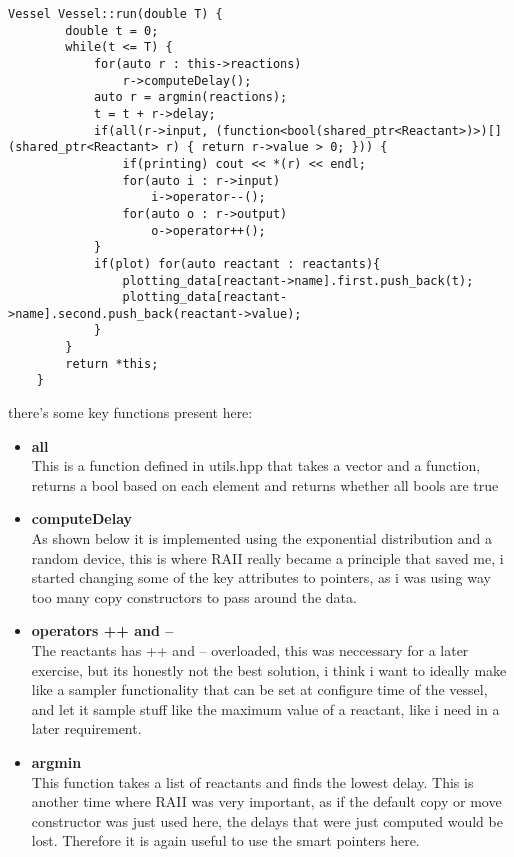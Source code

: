 \begin{lstlisting}[caption=algorithm implementation, style=colorC++]
    Vessel Vessel::run(double T) {
        double t = 0;
        while(t <= T) {
            for(auto r : this->reactions)
                r->computeDelay();
            auto r = argmin(reactions);
            t = t + r->delay;
            if(all(r->input, (function<bool(shared_ptr<Reactant>)>)[](shared_ptr<Reactant> r) { return r->value > 0; })) {
                if(printing) cout << *(r) << endl;
                for(auto i : r->input)
                    i->operator--();
                for(auto o : r->output)
                    o->operator++();
            }
            if(plot) for(auto reactant : reactants){
                plotting_data[reactant->name].first.push_back(t);
                plotting_data[reactant->name].second.push_back(reactant->value);
            }
        }
        return *this;
    }
\end{lstlisting}

there's some key functions present here:
\begin{itemize}
    \item{
        \textbf{all}\\
        This is a function defined in utils.hpp that takes a vector and a function, returns a bool based on each element and returns whether all bools are true
    }
    \item{
        \textbf{computeDelay}\\
        As shown below it is implemented using the exponential distribution and a random device, this is where RAII really became a principle that saved me, i started changing some of the key attributes to pointers, as i was using way too many copy constructors to pass around the data.
    }
    \item{
        \textbf{operators ++ and --}\\
        The reactants has ++ and -- overloaded, this was neccessary for a later exercise, but its honestly not the best solution, i think i want to ideally make like a sampler functionality that can be set at configure time of the vessel, and let it sample stuff like the maximum value of a reactant, like i need in a later requirement.
    }
    \item{
        \textbf{argmin}\\
        This function takes a list of reactants and finds the lowest delay. This is another time where RAII was very important, as if the default copy or move constructor was just used here, the delays that were just computed would be lost. Therefore it is again useful to use the smart pointers here.
    }
\end{itemize}

